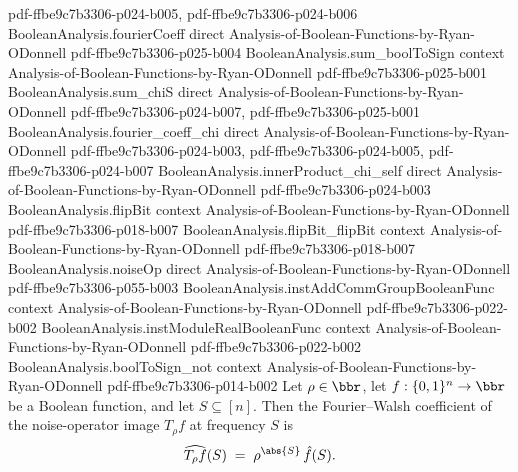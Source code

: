 \begin{theorem}
  {pdf-ffbe9c7b3306-p024-b005,
    pdf-ffbe9c7b3306-p024-b006}
\proofstep
  {BooleanAnalysis.fourierCoeff}
  {direct}
  {Analysis-of-Boolean-Functions-by-Ryan-ODonnell}
  {pdf-ffbe9c7b3306-p025-b004}
\proofstep
  {BooleanAnalysis.sum_boolToSign}
  {context}
  {Analysis-of-Boolean-Functions-by-Ryan-ODonnell}
  {pdf-ffbe9c7b3306-p025-b001}
\proofstep
  {BooleanAnalysis.sum_chiS}
  {direct}
  {Analysis-of-Boolean-Functions-by-Ryan-ODonnell}
  {pdf-ffbe9c7b3306-p024-b007,
    pdf-ffbe9c7b3306-p025-b001}
\proofstep
  {BooleanAnalysis.fourier_coeff_chi}
  {direct}
  {Analysis-of-Boolean-Functions-by-Ryan-ODonnell}
  {pdf-ffbe9c7b3306-p024-b003,
    pdf-ffbe9c7b3306-p024-b005,
    pdf-ffbe9c7b3306-p024-b007}
\proofstep
  {BooleanAnalysis.innerProduct_chi_self}
  {direct}
  {Analysis-of-Boolean-Functions-by-Ryan-ODonnell}
  {pdf-ffbe9c7b3306-p024-b003}
\proofstep
  {BooleanAnalysis.flipBit}
  {context}
  {Analysis-of-Boolean-Functions-by-Ryan-ODonnell}
  {pdf-ffbe9c7b3306-p018-b007}
\proofstep
  {BooleanAnalysis.flipBit_flipBit}
  {context}
  {Analysis-of-Boolean-Functions-by-Ryan-ODonnell}
  {pdf-ffbe9c7b3306-p018-b007}
\proofstep
  {BooleanAnalysis.noiseOp}
  {direct}
  {Analysis-of-Boolean-Functions-by-Ryan-ODonnell}
  {pdf-ffbe9c7b3306-p055-b003}
\proofstep
  {BooleanAnalysis.instAddCommGroupBooleanFunc}
  {context}
  {Analysis-of-Boolean-Functions-by-Ryan-ODonnell}
  {pdf-ffbe9c7b3306-p022-b002}
\proofstep
  {BooleanAnalysis.instModuleRealBooleanFunc}
  {context}
  {Analysis-of-Boolean-Functions-by-Ryan-ODonnell}
  {pdf-ffbe9c7b3306-p022-b002}
\proofstep
  {BooleanAnalysis.boolToSign_not}
  {context}
  {Analysis-of-Boolean-Functions-by-Ryan-ODonnell}
  {pdf-ffbe9c7b3306-p014-b002}
Let $\rho\in\bbr$, let $f:\{0,1\}^n\to\bbr$ be a Boolean function, and let
$S\subseteq[n]$. Then the Fourier--Walsh coefficient of the noise-operator image $T_\rho
f$ at frequency $S$ is
\[
  \widehat{T_\rho f}(S) \;=\; \rho^{\abs{S}}\,\hat f(S).
\]
\end{theorem}

